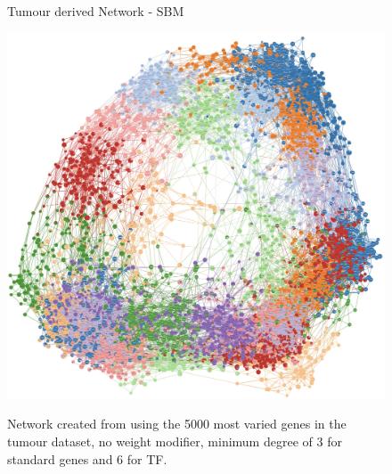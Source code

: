 
\newpage
{}
\begin{figure}[p]
      \thispagestyle{empty} %
      \centering
      \captionsetup{justification=centering, labelfont=bf}
      \parbox{\textwidth}{\centering \Huge Tumour derived Network - SBM       \vspace{0.5cm} } %
      \includegraphics[width=0.9\paperwidth,keepaspectratio]{Sections/Network_pages/images/sbm_standard_5K_6TF_lowRes.jpg} 
      \parbox{0.8\textwidth}{\centering Network created from using the 5000 most varied genes in the tumour dataset, no weight modifier, minimum degree of 3 for standard genes and 6 for TF.}
\end{figure}
\restoregeometry
